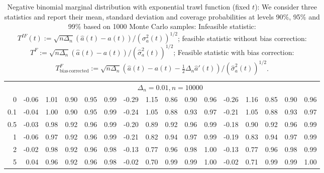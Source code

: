 \documentclass{article}
\theoremstyle{plain}
\theoremstyle{definition}
\theoremstyle{remark}
\begin{document}
\begin{appendix}
{\begin{table}[ht]
\begin{tabular}{r|rrrrr|rrrrr|rrrrr}
\midrule
& \multicolumn{15}{c}{$\Delta_n=0.01, n= 10000$} \\
0 & -0.06 & 1.01 & 0.90 & 0.95 & 0.99 & -0.29 & 1.15 & 0.86 & 0.90 & 0.96 & -0.26 & 1.16 & 0.85 & 0.90 & 0.96 \\ 
  0.1 & -0.04 & 1.00 & 0.90 & 0.95 & 0.99 & -0.24 & 1.05 & 0.88 & 0.93 & 0.97 & -0.21 & 1.05 & 0.88 & 0.93 & 0.97 \\ 
  0.5 & -0.03 & 0.98 & 0.92 & 0.96 & 0.99 & -0.20 & 0.89 & 0.92 & 0.96 & 0.99 & -0.18 & 0.90 & 0.92 & 0.96 & 0.99 \\ 
  1 & -0.06 & 0.97 & 0.92 & 0.96 & 0.99 & -0.21 & 0.82 & 0.94 & 0.97 & 0.99 & -0.19 & 0.83 & 0.94 & 0.97 & 0.99 \\ 
  2 & -0.02 & 0.98 & 0.92 & 0.96 & 0.98 & -0.13 & 0.77 & 0.96 & 0.98 & 1.00 & -0.13 & 0.77 & 0.96 & 0.98 & 0.99 \\ 
  5 & 0.04 & 0.96 & 0.92 & 0.96 & 0.98 & -0.02 & 0.70 & 0.99 & 0.99 & 1.00 & -0.02 & 0.71 & 0.99 & 0.99 & 1.00 \\ 
   \bottomrule
\end{tabular}
\caption{ \label{tab:NB-Exp-fixedt} Negative binomial marginal distribution with exponential trawl function (fixed $t$): We consider three statistics and report their mean, standard deviation and coverage probabilities at levels 90\%, 95\% and 99\% based on 1000 Monte Carlo samples:
Infeasible statistic:
	$T^{IF}(t):=\sqrt{n\Delta_{n}}\left(\hat{a}(t)-a(t)\right)/(\sigma_a^2(t))^{1/2}$; feasible statistic without bias correction:
	$T^{F}:=\sqrt{n\Delta_{n}}\left(\hat{a}(t)-a(t)\right)/(\hat \sigma_a^2(t))^{1/2}$; Feasible statistic with bias correction:
	$T^{F}_{\mathrm{bias \, corrected}}:=\sqrt{n\Delta_{n}}\left(\hat{a}(t)-a(t)-\frac{1}{2}\Delta_n \hat a'(t)\right)/(\hat \sigma_a^2(t))^{1/2}$.}
\end{table}
	
}



\end{appendix}
\end{document}
